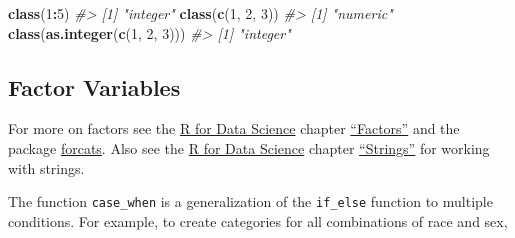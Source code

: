 \documentclass[]{book}
\newenvironment{Shaded}{\begin{snugshade}}{\end{snugshade}}
\newcommand{\KeywordTok}[1]{\textcolor[rgb]{0.13,0.29,0.53}{\textbf{#1}}}
\newcommand{\DataTypeTok}[1]{\textcolor[rgb]{0.13,0.29,0.53}{#1}}
\newcommand{\DecValTok}[1]{\textcolor[rgb]{0.00,0.00,0.81}{#1}}
\newcommand{\StringTok}[1]{\textcolor[rgb]{0.31,0.60,0.02}{#1}}
\newcommand{\CommentTok}[1]{\textcolor[rgb]{0.56,0.35,0.01}{\textit{#1}}}
\newcommand{\OperatorTok}[1]{\textcolor[rgb]{0.81,0.36,0.00}{\textbf{#1}}}
\newcommand{\NormalTok}[1]{#1}
\theoremstyle{definition}
\theoremstyle{definition}
\theoremstyle{definition}
\theoremstyle{remark}
\begin{document}
\begin{Shaded}
\begin{Highlighting}[]
\KeywordTok{class}\NormalTok{(}\DecValTok{1}\OperatorTok{:}\DecValTok{5}\NormalTok{)}
\CommentTok{#> [1] "integer"}
\KeywordTok{class}\NormalTok{(}\KeywordTok{c}\NormalTok{(}\DecValTok{1}\NormalTok{, }\DecValTok{2}\NormalTok{, }\DecValTok{3}\NormalTok{))}
\CommentTok{#> [1] "numeric"}
\KeywordTok{class}\NormalTok{(}\KeywordTok{as.integer}\NormalTok{(}\KeywordTok{c}\NormalTok{(}\DecValTok{1}\NormalTok{, }\DecValTok{2}\NormalTok{, }\DecValTok{3}\NormalTok{)))}
\CommentTok{#> [1] "integer"}
\end{Highlighting}
\end{Shaded}

\subsection{Factor Variables}\label{factor-variables}

For more on factors see the \href{http://r4ds.had.co.nz/}{R for Data
Science} chapter \href{http://r4ds.had.co.nz/factors.html}{``Factors''}
and the package
\href{https://cran.r-project.org/package=forcats}{forcats}. Also see the
\href{http://r4ds.had.co.nz/}{R for Data Science} chapter
\href{http://r4ds.had.co.nz/strings.html}{``Strings''} for working with
strings.

The function \texttt{case\_when} is a generalization of the
\texttt{if\_else} function to multiple conditions. For example, to
create categories for all combinations of race and sex,

\begin{Shaded}
\end{Shaded}
\end{document}
